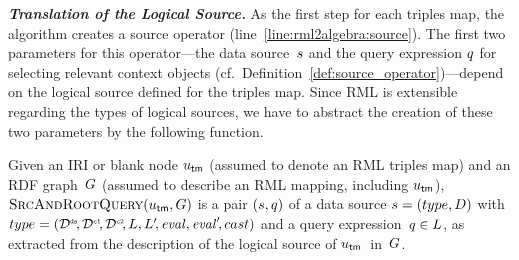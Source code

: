 \enlargethispage{\baselineskip}%

\smallskip\noindent\textbf{\itshape Translation of the Logical Source.}
As the first step for each triples map, the algorithm creates a source operator
(line~\ref{line:rml2algebra:source}). The first two parameters for this operator---the data source~$s$ and the query expression $q$ for selecting relevant context objects (cf.\ Definition~\ref{def:source_operator})---depend on the logical source defined for the triples map. Since RML is extensible regarding the types of logical sources,
	we have to
abstract the creation of these two parameters by the following function.

\begin{definition}
	\label{def:initSrcAndRootQuery}
	\normalfont
	Given an IRI or blank node $u_\mathsf{tm}$ (assumed to denote an RML triples map) and an RDF graph~$G$ (assumed to describe an RML mapping, including
	$u_\mathsf{tm}$),
	$\textsc{SrcAndRootQuery}(u_\mathsf{tm},G)$ is a pair $(s, q)$ of a data source $s = (type,D)$ with $type = (\mathcal{D}^\texttt{\tiny ds}\!, \mathcal{D}^\texttt{\tiny c1}\!, \mathcal{D}^\texttt{\tiny c2}\!, L, L'\!, \mathit{eval}, \mathit{eval}'\!, cast)$ and a query expression~$q \in L$, as extracted from the description of the logical source of $u_\mathsf{tm}$~in~$G$.
\end{definition}


\vspace{-2mm} %

